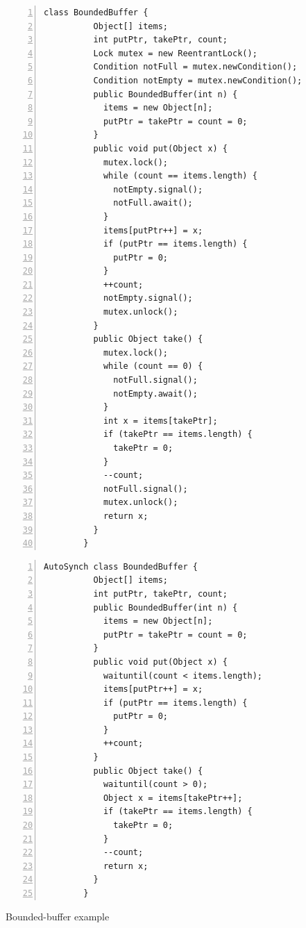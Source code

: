 \documentclass[preprint]{sigplanconf}
\begin{document}
\begin{figure}[ht!]
\begin{multicols}{2}
    \begin{Verbatim}[fontsize=\footnotesize,gobble=8,frame=topline,
            framesep=5mm,numbers=left,numbersep=2pt,
            label=\fbox{\small\emph{Explicit-Signal}}]
        class BoundedBuffer {
          Object[] items;  
          int putPtr, takePtr, count;
          Lock mutex = new ReentrantLock();
          Condition notFull = mutex.newCondition();
          Condition notEmpty = mutex.newCondition();
          public BoundedBuffer(int n) {
            items = new Object[n];
            putPtr = takePtr = count = 0;
          }
          public void put(Object x) {
            mutex.lock();
            while (count == items.length) {
              notEmpty.signal();
              notFull.await();
            }
            items[putPtr++] = x;
            if (putPtr == items.length) {
              putPtr = 0;
            }
            ++count;
            notEmpty.signal();
            mutex.unlock();
          }
          public Object take() {
            mutex.lock();
            while (count == 0) {
              notFull.signal();
              notEmpty.await();
            }
            int x = items[takePtr];
            if (takePtr == items.length) {
              takePtr = 0;
            }
            --count;
            notFull.signal();
            mutex.unlock();
            return x;
          }
        }
    \end{Verbatim}
    \begin{Verbatim}[fontsize=\footnotesize,gobble=8,frame=lines,framesep=5mm,
            numbers=left,numbersep=2pt,
            label=\fbox{\small\emph{Automatic-Signal}}]
        AutoSynch class BoundedBuffer { 
          Object[] items; 
          int putPtr, takePtr, count; 
          public BoundedBuffer(int n) {
            items = new Object[n];
            putPtr = takePtr = count = 0;
          }
          public void put(Object x) { 
            waituntil(count < items.length); 
            items[putPtr++] = x; 
            if (putPtr == items.length) { 
              putPtr = 0; 
            } 
            ++count; 
          } 
          public Object take() { 
            waituntil(count > 0); 
            Object x = items[takePtr++]; 
            if (takePtr == items.length) { 
              takePtr = 0; 
            }
            --count;
            return x;
          }
        }
    \end{Verbatim}
\end{multicols}
  \caption{Bounded-buffer example}
  \label{fig:bb_exp}
\end{figure}
\end{document}
